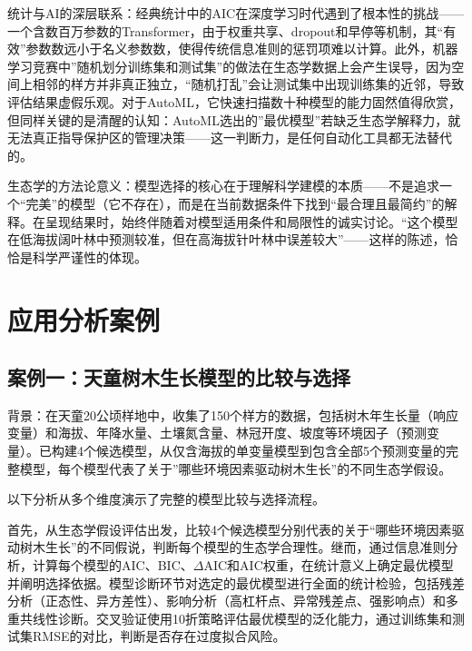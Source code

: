 \documentclass[
  twoside,12pt,fontset=none]{ctexbook}
\begin{document}
统计与AI的深层联系：经典统计中的AIC在深度学习时代遇到了根本性的挑战------一个含数百万参数的Transformer，由于权重共享、dropout和早停等机制，其``有效''参数数远小于名义参数数，使得传统信息准则的惩罚项难以计算。此外，机器学习竞赛中''随机划分训练集和测试集''的做法在生态学数据上会产生误导，因为空间上相邻的样方并非真正独立，``随机打乱''会让测试集中出现训练集的近邻，导致评估结果虚假乐观。对于AutoML，它快速扫描数十种模型的能力固然值得欣赏，但同样关键的是清醒的认知：AutoML选出的''最优模型''若缺乏生态学解释力，就无法真正指导保护区的管理决策------这一判断力，是任何自动化工具都无法替代的。

生态学的方法论意义：模型选择的核心在于理解科学建模的本质------不是追求一个``完美''的模型（它不存在），而是在当前数据条件下找到``最合理且最简约''的解释。在呈现结果时，始终伴随着对模型适用条件和局限性的诚实讨论。``这个模型在低海拔阔叶林中预测较准，但在高海拔针叶林中误差较大''------这样的陈述，恰恰是科学严谨性的体现。

\hypertarget{ux5e94ux7528ux5206ux6790ux6848ux4f8b-7}{%
\section{应用分析案例}\label{ux5e94ux7528ux5206ux6790ux6848ux4f8b-7}}

\hypertarget{ux6848ux4f8bux4e00ux5929ux7ae5ux6811ux6728ux751fux957fux6a21ux578bux7684ux6bd4ux8f83ux4e0eux9009ux62e9}{%
\subsection{案例一：天童树木生长模型的比较与选择}\label{ux6848ux4f8bux4e00ux5929ux7ae5ux6811ux6728ux751fux957fux6a21ux578bux7684ux6bd4ux8f83ux4e0eux9009ux62e9}}

背景：在天童20公顷样地中，收集了150个样方的数据，包括树木年生长量（响应变量）和海拔、年降水量、土壤氮含量、林冠开度、坡度等环境因子（预测变量）。已构建4个候选模型，从仅含海拔的单变量模型到包含全部5个预测变量的完整模型，每个模型代表了关于''哪些环境因素驱动树木生长''的不同生态学假设。

以下分析从多个维度演示了完整的模型比较与选择流程。

首先，从生态学假设评估出发，比较4个候选模型分别代表的关于``哪些环境因素驱动树木生长''的不同假说，判断每个模型的生态学合理性。继而，通过信息准则分析，计算每个模型的AIC、BIC、\(\Delta\)AIC和AIC权重，在统计意义上确定最优模型并阐明选择依据。模型诊断环节对选定的最优模型进行全面的统计检验，包括残差分析（正态性、异方差性）、影响分析（高杠杆点、异常残差点、强影响点）和多重共线性诊断。交叉验证使用10折策略评估最优模型的泛化能力，通过训练集和测试集RMSE的对比，判断是否存在过度拟合风险。
\end{document}
